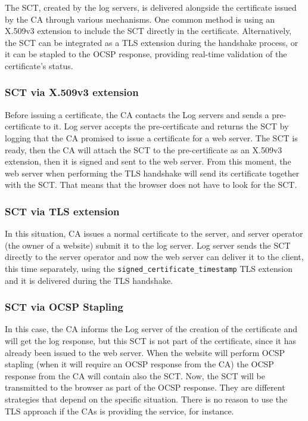 The SCT, created by the log servers, is delivered alongside the
certificate issued by the CA through various mechanisms. One common
method is using an X.509v3 extension to include the SCT directly in
the certificate. Alternatively, the SCT can be integrated as a TLS
extension during the handshake process, or it can be stapled to the
OCSP response, providing real-time validation of the certificate's
status.

\subsubsection{SCT via X.509v3 extension}
Before issuing a certificate, the CA contacts the Log servers and sends a
pre-certificate to it. Log server accepts the pre-certificate and returns the
SCT by logging that the CA promised to issue a certificate for a web server.
The SCT is ready, then the CA will attach the SCT to the pre-certificate as
an X.509v3 extension, then it is signed and sent to the web server. From
this moment, the web server when performing the TLS handshake will
send its certificate together with the SCT. That means that the browser does
not have to look for the SCT.
\subsubsection{SCT via TLS extension}
In this situation, CA issues a normal certificate to the server, and
server operator (the owner of a website) submit it to the log server.
Log server sends the SCT directly to the server operator and now the
web server can deliver it to the client, this time separately, using the
\texttt{signed\_certificate\_timestamp} TLS extension and it is delivered
during the TLS handshake.
\subsubsection{SCT via OCSP Stapling}
In this case, the CA informs the Log server of the creation of the
certificate and will get the log response, but this SCT is not part of
the certificate, since it has already been issued to the web server.
When the website will perform OCSP stapling (when it will require
an OCSP response from the CA) the OCSP response from the CA will
contain also the SCT. Now, the SCT will be transmitted to the
browser as part of the OCSP response.
They are different strategies that depend on the specific situation.
There is no reason to use the TLS approach if the CAs is providing
the service, for instance.

